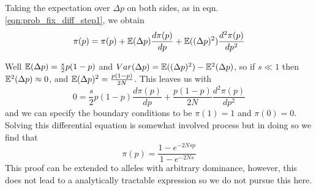 Taking the expectation over $\Delta p $ on both sides, as in
eqn. \ref{eqn:prob_fix_diff_step1}, we obtain
\begin{equation}
\pi(p) = \pi(p) + \mathbb{E}(\Delta p) \frac{d\pi (p)}{dp} + \mathbb{E}((\Delta p)^2)
\frac{d^2\pi(p)}{dp^2}
\end{equation}

Well $\mathbb{E}(\Delta p) = \frac{s}{2}p(1-p)$ and $Var(\Delta p)= \mathbb{E}((\Delta
p)^2)-\mathbb{E}^2(\Delta p)$, so if $s \ll 1$ then $\mathbb{E}^2(\Delta p) \approx
0$, and $\mathbb{E}(\Delta p)^2 = \frac{p(1-p)}{2N}$. This leaves us with
\begin{equation}
0= \frac{s}{2}p(1-p)\frac{d\pi (p) }{dp} + \frac{p(1-p)}{2N}
\frac{d^2\pi (p) }{dp^2}
\end{equation}
and we can specify the boundary conditions to be $\pi(1)=1$ and $\pi(0)=0$. 
Solving this differential equation is somewhat involved process but in
doing so we find that
\begin{equation}
\pi(p) = \frac{1-e^{-2Ns p }}{1-e^{-2Ns}}
\end{equation}
This proof can be extended
to alleles with arbitrary dominance, however, this does not lead to a
analytically tractable expression so we do not pursue this here. 

